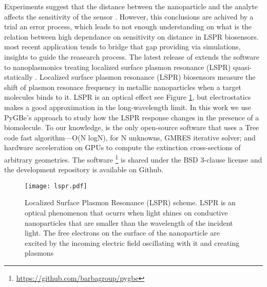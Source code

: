 






Experiments suggest that the distance between the nanoparticle and the analyte 
affects the sensitivity of the sensor \cite{HaesETal2004}. However, this conclusions
are achived by a trial an error process, which leads to not enough understanding
on what is the relation between high dependance on sensitivity on distance in LSPR
biosensors. \pygbe most recent application \cite{ClementiETal2017} tends to 
bridge that gap providing via simulations, insights to guide the reasearch process.
The latest release of \pygbe extends the software to nanoplasmonics treating 
localized surface plasmon resonance (LSPR) quasi-statically \cite{MayergoyzZhang2007}.
Localized surface plasmon resonance (LSPR) biosensors measure the shift of 
plasmon resonace frequency in metallic nanoparticles when a target molecules 
binds to it. LSPR is an optical effect see Figure \ref{fig:lspr}, but electrostatics 
makes a good approximation in the long-wavelength limit. In this work we use
PyGBe's approach to study how the LSPR response changes in the presence of a 
biomolecule. To our knowledge, \pygbe is the only open-source software that uses a Tree code 
fast algorithm—O(N logN), for N unknowns, GMRES iterative solver; and hardware 
acceleration on GPUs to compute the extinction cross-sections of arbitrary 
geometries. The software \footnote{\url{https://github.com/barbagroup/pygbe}} is shared 
under the BSD 3-clause license and the development repository is available on 
Github.



\begin{figure}[h] %
   \centering
   \texttt{[image: lspr.pdf]} 
   \caption{Localized Surface Plasmon Resonance (LSPR) scheme. LSPR is an 
            optical phenomenon that ocurrs when light shines on conductive 
            nanoparticles that are smaller than the wavelength of the incident 
            light. The free electrons on the surface of the nanoparticle are 
            excited by the incoming electric field oscillating with it and 
            creating plasmons}
   \label{fig:lspr}
\end{figure}




